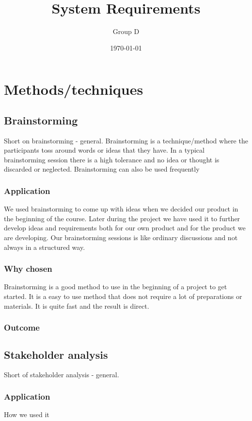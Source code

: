 \documentclass[a4paper]{article}
\title{System Requirements}
\author{Group D}
\date{\today}
\begin{document}
  \tableofcontents

  \section{Methods/techniques}
  \subsection{Brainstorming}
  Short on brainstorming - general.
  Brainstorming is a technique/method where the participants toss around words or ideas that they have. In a typical brainstorming session there is a high tolerance and no idea or thought is discarded or neglected. Brainstorming can also be used frequently 
    \subsubsection{Application}
    We used brainstorming to come up with ideas when we decided our product in the beginning of the course. Later during the project we have used it to further develop ideas and requirements both for our own product and for the product we are developing. Our brainstorming sessions is like ordinary discussions and not always in a structured way.
    \subsubsection{Why chosen}

    Brainstorming is a good method to use in the beginning of a project to get started. It is a easy to use method that does not require a lot of preparations or materials. It is quite fast and the result is direct. 

    \subsubsection{Outcome}
    
    \subsection{Stakeholder analysis}
    Short of stakeholder analysis - general.

    
    \subsubsection{Application}
    How we used it
\end{document}

